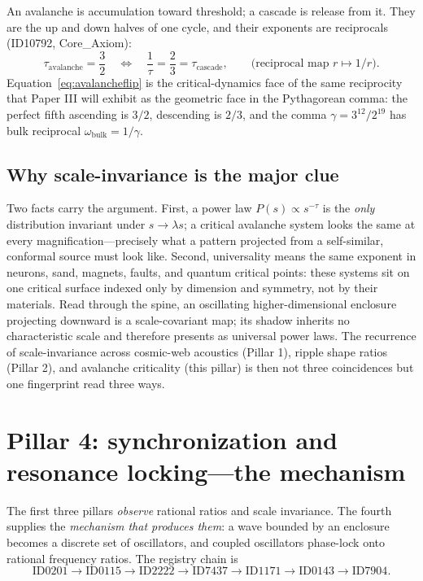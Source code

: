 \documentclass[11pt]{article}
\theoremstyle{remark}
\begin{document}
An avalanche is accumulation toward threshold; a cascade is release from it. They are the up and down halves of one cycle, and their exponents are reciprocals (ID10792, Core\_Axiom):
\begin{equation}
\tau_{\mathrm{avalanche}} = \frac{3}{2} \quad \Longleftrightarrow \quad \frac{1}{\tau} = \frac{2}{3} = \tau_{\mathrm{cascade}},
\qquad \text{(reciprocal map } r \mapsto 1/r\text{)}.
\label{eq:avalancheflip}
\end{equation}
Equation~\eqref{eq:avalancheflip} is the critical-dynamics face of the same reciprocity that Paper III will exhibit as the geometric face in the Pythagorean comma: the perfect fifth ascending is $3/2$, descending is $2/3$, and the comma $\gamma = 3^{12}/2^{19}$ has bulk reciprocal $\omega_{\mathrm{bulk}} = 1/\gamma$.

\subsection{Why scale-invariance is the major clue}

Two facts carry the argument. First, a power law $P(s) \propto s^{-\tau}$ is the \emph{only} distribution invariant under $s \to \lambda s$; a critical avalanche system looks the same at every magnification---precisely what a pattern projected from a self-similar, conformal source must look like. Second, universality means the same exponent in neurons, sand, magnets, faults, and quantum critical points: these systems sit on one critical surface indexed only by dimension and symmetry, not by their materials. Read through the spine, an oscillating higher-dimensional enclosure projecting downward is a scale-covariant map; its shadow inherits no characteristic scale and therefore presents as universal power laws. The recurrence of scale-invariance across cosmic-web acoustics (Pillar 1), ripple shape ratios (Pillar 2), and avalanche criticality (this pillar) is then not three coincidences but one fingerprint read three ways.

\section{Pillar 4: synchronization and resonance locking---the mechanism}
\label{sec:pillar4}

The first three pillars \emph{observe} rational ratios and scale invariance. The fourth supplies the \emph{mechanism that produces them}: a wave bounded by an enclosure becomes a discrete set of oscillators, and coupled oscillators phase-lock onto rational frequency ratios. The registry chain is
\begin{equation*}
\text{ID0201} \to \text{ID0115} \to \text{ID2222} \to \text{ID7437} \to \text{ID1171} \to \text{ID0143} \to \text{ID7904}.
\end{equation*}
\end{document}
